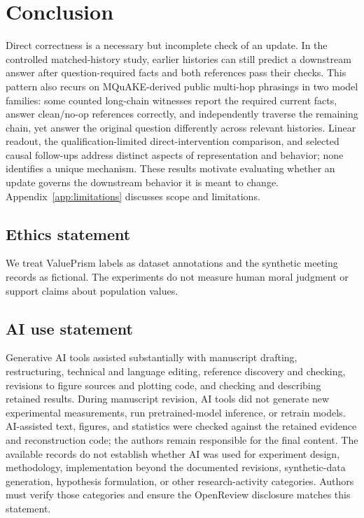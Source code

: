 \documentclass{article}
\begin{document}
\section{Conclusion}
Direct correctness is a necessary but incomplete check of an update. In the controlled matched-history study, earlier histories can still predict a downstream answer after question-required facts and both references pass their checks. This pattern also recurs on MQuAKE-derived public multi-hop phrasings in two model families: some counted long-chain witnesses report the required current facts, answer clean/no-op references correctly, and independently traverse the remaining chain, yet answer the original question differently across relevant histories. Linear readout, the qualification-limited direct-intervention comparison, and selected causal follow-ups address distinct aspects of representation and behavior; none identifies a unique mechanism. These results motivate evaluating whether an update governs the downstream behavior it is meant to change. Appendix~\ref{app:limitations} discusses scope and limitations.

\subsection*{Ethics statement}
We treat ValuePrism labels as dataset annotations and the synthetic meeting records as fictional. The experiments do not measure human moral judgment or support claims about population values.

\subsection*{AI use statement}
Generative AI tools assisted substantially with manuscript drafting, restructuring, technical and language editing, reference discovery and checking, revisions to figure sources and plotting code, and checking and describing retained results. During manuscript revision, AI tools did not generate new experimental measurements, run pretrained-model inference, or retrain models. AI-assisted text, figures, and statistics were checked against the retained evidence and reconstruction code; the authors remain responsible for the final content. The available records do not establish whether AI was used for experiment design, methodology, implementation beyond the documented revisions, synthetic-data generation, hypothesis formulation, or other research-activity categories. Authors must verify those categories and ensure the OpenReview disclosure matches this statement.
\end{document}
